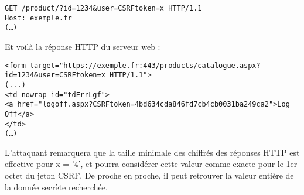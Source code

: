 \begin{verbatim}
GET /product/?id=1234&user=CSRFtoken=x HTTP/1.1
Host: exemple.fr
(…)
\end{verbatim}

Et voilà la réponse HTTP du serveur web :

\begin{verbatim}
<form target="https://exemple.fr:443/products/catalogue.aspx?id=1234&user=CSRFtoken=x HTTP/1.1">
(...)
<td nowrap id="tdErrLgf">
<a href="logoff.aspx?CSRFtoken=4bd634cda846fd7cb4cb0031ba249ca2">Log Off</a>
</td>
(…)
\end{verbatim}

L'attaquant remarquera que la taille minimale des chiffrés des réponses HTTP est effective pour x = '4', et pourra considérer cette valeur comme exacte pour le 1er octet du jeton CSRF. De proche en proche, il peut retrouver la valeur entière de la donnée secrète recherchée.


